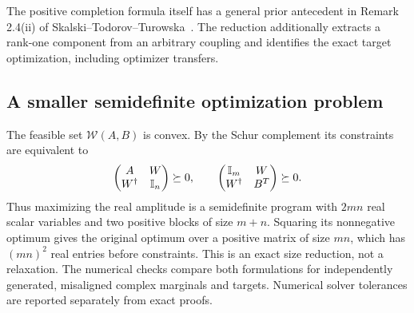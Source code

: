 The positive completion formula itself has a general prior antecedent in
Remark 2.4(ii) of Skalski--Todorov--Turowska~\cite{capacity2025}.
The reduction additionally extracts a rank-one component from an arbitrary
coupling and identifies the exact target optimization, including optimizer
transfers.

\subsection{A smaller semidefinite optimization problem}
The feasible set $\mathcal W(A,B)$ is convex. By the Schur complement its constraints are equivalent to
\[
 \begin{pmatrix}A&W\\W^\dagger&\mathbb I_n\end{pmatrix}\succeq0,
 \qquad
 \begin{pmatrix}\mathbb I_m&W\\W^\dagger&B^T\end{pmatrix}\succeq0.
\]
Thus maximizing the real amplitude is a semidefinite program with $2mn$ real scalar variables and two positive blocks of size $m+n$. Squaring its nonnegative optimum gives the original optimum over a positive matrix of size $mn$, which has $(mn)^2$ real entries before constraints. This is an exact size reduction, not a relaxation. The numerical checks compare both formulations for independently generated, misaligned complex marginals and targets. Numerical solver tolerances are reported separately from exact proofs.

